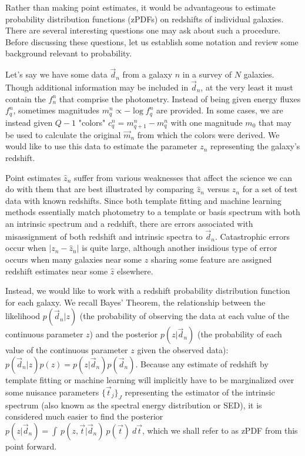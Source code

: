 \documentclass[12pt, onecolumn]{emulateapj}
\begin{document}
Rather than making point estimates, it would be advantageous to estimate probability distribution functions (zPDFs) on redshifts of individual galaxies.  There are several interesting questions one may ask about such a procedure.  Before discussing these questions, let us establish some notation and review some background relevant to probability.

Let's say we have some data $\vec{d}_{n}$ from a galaxy $n$ in a survey of $N$ galaxies.  Though additional information may be included in $\vec{d}_{n}$, at the very least it must contain the $f_{n}^{n}$ that comprise the photometry.  Instead of being given energy fluxes $f_{q}^{n}$, sometimes magnitudes $m_{q}^{n}\propto -\log f_{q}^{n}$ are provided.  In some cases, we are instead given $Q-1$ "colors" $c_{q}^{n}=m_{q+1}^{n}-m_{q}^{n}$ with one magnitude $m_{0}$ that may be used to calculate the original $\vec{m}_{n}$ from which the colors were derived.  We would like to use this data to estimate the parameter $z_{n}$ representing the galaxy's redshift.  

Point estimates $\hat{z}_{n}$ suffer from various weaknesses that affect the science we can do with them that are best illustrated by comparing $\hat{z}_{n}$ versus $z_{n}$ for a set of test data with known redshifts.  Since both template fitting and machine learning methods essentially match photometry to a template or basis spectrum with both an intrinsic spectrum and a redshift, there are errors associated with misassignment of both redshift and intrinsic spectra to $\vec{d}_{n}$.  Catastrophic errors occur when $|z_{n}-\hat{z}_{n}|$ is quite large, although another insidious type of error occurs when many galaxies near some $z$ sharing some feature are assigned redshift estimates near some $\hat{z}$ elsewhere. 

Instead, we would like to work with a redshift probability distribution function for each galaxy.  We recall Bayes' Theorem, the relationship between the likelihood $p(\vec{d}_{n}|z)$ (the probability of observing the data at each value of the continuous parameter $z$) and the posterior $p(z|\vec{d}_{n})$ (the probability of each value of the continuous parameter $z$ given the observed data): $p(\vec{d}_{n}|z)p(z)=p(z|\vec{d}_{n})p(\vec{d}_{n})$.  Because any estimate of redshift by template fitting or machine learning will implicitly have to be marginalized over some nuisance parameters $\{\vec{t}_{j}\}_{J}$ representing the estimator of the intrinsic spectrum (also known as the spectral energy distribution or SED), it is considered much easier to find the posterior $p(z|\vec{d}_{n})=\int\ p(z,\vec{t}|\vec{d}_{n})\ p(\vec{t})\ d\vec{t}$, which we shall refer to as zPDF from this point forward.
\end{document}
